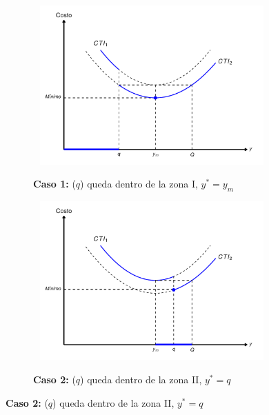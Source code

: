 \begin{figure}[h!]
		\caption{Solución óptima del problema de inventario con descuentos}
    \centering
    \begin{subfigure}[b]{1\textwidth} %
    		\caption{\textbf{Caso 1:} ($q$) queda dentro de la zona I, $y^* = y_m$}
        \includegraphics[width=13cm, height=6.1cm]{images/img4.pdf}
        \label{fig:img4a}
    \end{subfigure}

    \vspace{0.2cm}

    \begin{subfigure}[b]{1\textwidth}
    		\caption{\textbf{Caso 2:} ($q$) queda dentro de la zona II, $y^* = q$}
        \includegraphics[width=13cm, height=6.1cm]{images/img5.pdf}
        \label{fig:img4b}
    \end{subfigure}
    
    \vspace{0.2cm}
    

\end{figure}
